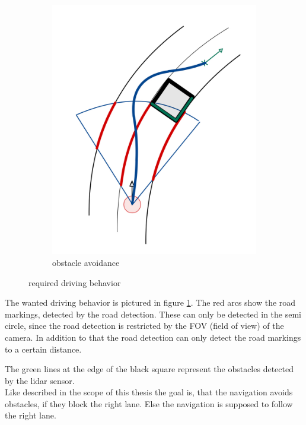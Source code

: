 \begin{figure}[H]
\begin{subfigure}{.3\linewidth}
		\includegraphics[width=\textwidth]{Pictures/obstaclee avoidance draw}
		\caption{obstacle avoidance}
	\end{subfigure}

	\caption{required driving behavior}
	\label{driving behavior}

\end{figure}

The wanted driving behavior is pictured in figure \ref{driving behavior}. The red arcs show the road markings, detected by the road detection. These can only be detected in the semi circle, since the road detection is restricted by the FOV (field of view) of the camera. In addition to that the road detection can only detect the road markings to a certain distance.

The green lines at the edge of the black square represent the obstacles detected by the lidar sensor.\\
Like described in the scope of this thesis the goal is, that the navigation avoids obstacles, if they block the right lane. Else the navigation is supposed to follow the right lane.

